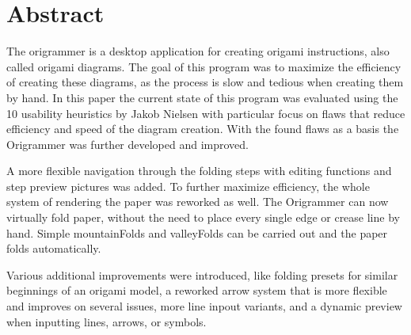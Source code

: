 
\section{Abstract}
\label{sec:abstract}

The \gls{origrammer} is a desktop application for creating origami instructions, also called origami \gls{diagram}s. The goal of this program was to maximize the efficiency of creating these diagrams, as the process is slow and tedious when creating them by hand.
In this paper the current state of this program was evaluated using the 10 usability heuristics by Jakob Nielsen \cite{10usability_heuristics} with particular focus on flaws that reduce efficiency and speed of the diagram creation. With the found flaws as a basis the Origrammer was further developed and improved.

A more flexible navigation through the folding steps with editing functions and step preview pictures was added. To further maximize efficiency, the whole system of rendering the paper was reworked as well. The Origrammer can now virtually fold paper, without the need to place every single edge or crease line by hand. Simple \gls{mountainFold}s and \gls{valleyFold}s can be carried out and the paper folds automatically. %

Various additional improvements were introduced, like folding presets for similar beginnings of an origami model, a reworked arrow system that is more flexible and improves on several issues, more line inpout variants, and a dynamic preview when inputting lines, arrows, or symbols.